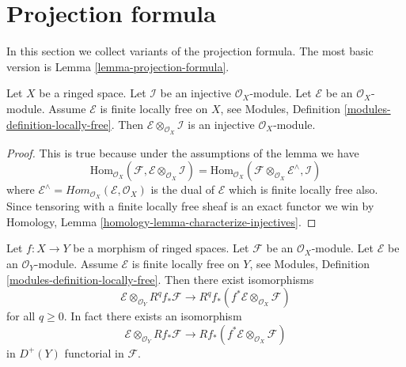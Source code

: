 \section{Projection formula}
\label{section-projection-formula}

\noindent
In this section we collect variants of the projection formula.
The most basic version is Lemma \ref{lemma-projection-formula}.

\begin{lemma}
\label{lemma-injective-tensor-finite-locally-free}
Let $X$ be a ringed space.
Let $\mathcal{I}$ be an injective $\mathcal{O}_X$-module.
Let $\mathcal{E}$ be an $\mathcal{O}_X$-module.
Assume $\mathcal{E}$ is finite locally free on $X$, see
Modules, Definition \ref{modules-definition-locally-free}.
Then $\mathcal{E} \otimes_{\mathcal{O}_X} \mathcal{I}$ is
an injective $\mathcal{O}_X$-module.
\end{lemma}

\begin{proof}
This is true because under the assumptions of the lemma we have
$$
\text{Hom}_{\mathcal{O}_X}(\mathcal{F},
\mathcal{E} \otimes_{\mathcal{O}_X} \mathcal{I})
=
\text{Hom}_{\mathcal{O}_X}(
\mathcal{F} \otimes_{\mathcal{O}_X} \mathcal{E}^\wedge, \mathcal{I})
$$
where
$\mathcal{E}^\wedge = \textit{Hom}_{\mathcal{O}_X}(\mathcal{E}, \mathcal{O}_X)$
is the dual of $\mathcal{E}$ which is finite locally free also. Since tensoring
with a finite locally free sheaf is an exact functor we win by
Homology, Lemma \ref{homology-lemma-characterize-injectives}.
\end{proof}

\begin{lemma}
\label{lemma-projection-formula}
Let $f : X \to Y$ be a morphism of ringed spaces.
Let $\mathcal{F}$ be an $\mathcal{O}_X$-module.
Let $\mathcal{E}$ be an $\mathcal{O}_Y$-module.
Assume $\mathcal{E}$ is finite locally free on $Y$, see
Modules, Definition \ref{modules-definition-locally-free}.
Then there exist isomorphisms
$$
\mathcal{E} \otimes_{\mathcal{O}_Y} R^qf_*\mathcal{F}
\longrightarrow
R^qf_*(f^*\mathcal{E} \otimes_{\mathcal{O}_X} \mathcal{F})
$$
for all $q \geq 0$. In fact there exists an isomorphism
$$
\mathcal{E} \otimes_{\mathcal{O}_Y} Rf_*\mathcal{F}
\longrightarrow
Rf_*(f^*\mathcal{E} \otimes_{\mathcal{O}_X} \mathcal{F})
$$
in $D^{+}(Y)$ functorial in $\mathcal{F}$.
\end{lemma}

